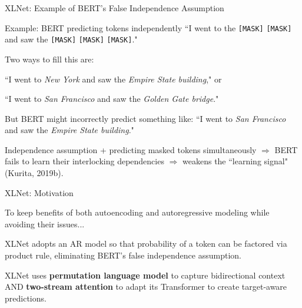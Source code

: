 \begin{frame}{XLNet: Example of BERT's False Independence Assumption}
    
\begin{exampleBlock}{Example: BERT predicting tokens independently}
``I went to the \texttt{[MASK]} \texttt{[MASK]} and saw the \texttt{[MASK]} \texttt{[MASK]} \texttt{[MASK]}." 

Two ways to fill this are: 

``I went to \emph{New York} and saw the \textit{Empire State building}," or

``I went to \emph{San Francisco} and saw the \emph{Golden Gate bridge}."

But BERT might incorrectly predict something like: ``I went to \emph{San Francisco} and saw the \emph{Empire State building}." 

Independence assumption + predicting masked tokens simultaneously $\Rightarrow$ BERT fails to learn their interlocking dependencies $\Rightarrow$ weakens the ``learning signal" (Kurita, 2019b). 
\end{exampleBlock}

\end{frame}


\begin{frame}{XLNet: Motivation}

\large 

To keep benefits of both autoencoding and autoregressive modeling while avoiding their issues...

\begin{enumerateSpaced}{7pt}
    \item XLNet adopts an AR model so that probability of a token can be factored via product rule, eliminating BERT's false independence assumption. 
    
    \item XLNet uses \textbf{permutation language model} to capture bidirectional context AND \textbf{two-stream attention} to adapt its Transformer to create target-aware predictions. 
\end{enumerateSpaced}
    
\end{frame}



